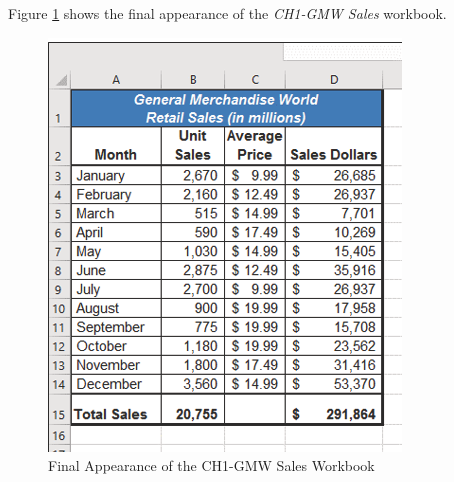 Figure \ref{01:fig48} shows the final appearance of the \textit{CH1-GMW Sales} workbook.

\begin{figure}[H]
	\centering
	\includegraphics[width=\maxwidth{.95\linewidth}]{gfx/ch01_fig48}
	\caption{Final Appearance of the CH1-GMW Sales Workbook}
	\label{01:fig48}
\end{figure}

